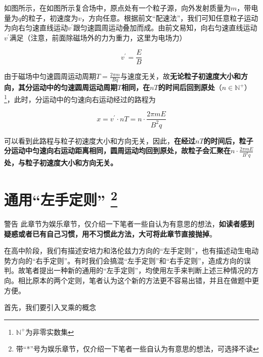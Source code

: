 

如图所示，在如图所示复合场中，原点处有一个粒子源，向外发射质量为$m$，带电量为$q$的粒子，初速度为$v$，方向任意。根据前文“配速法”，我们可知任意粒子运动为向右匀速直线运动$v^{\prime}$跟匀速圆周运动叠加而成。由前文易知，向右匀速直线运动$v^{\prime}$满足（注意，前面除磁场外的力为重力，这里为电场力）

$$v^{\prime} = \frac{E}{B}$$

由于磁场中匀速圆周运动周期$T = \frac{2 \pi m}{Bq}$与速度无关，故\textbf{无论粒子初速度大小和方向，其分运动中的匀速圆周运动周期$T$相同，在$n T$的时间后回到原处}（$n \in \mathbb{N^{+}}$）\footnote{$\mathbb{N^{+}}$为非零实数集}，此时，分运动中的匀速向右运动经过的路程为

$$x = v^{\prime} \cdot n T = n \cdot \frac{2 \pi m E}{B^2 q}$$

可以看到此路程与粒子初速度大小和方向无关，因此，\textbf{在经过$nT$的时间后，粒子分运动中匀速向右运动距离相同，圆周运动均回到原处，故粒子会汇聚在$n \cdot \frac{2 \pi m E}{B^2 q}$处，与粒子初速度大小和方向无关。}

\section{通用“左手定则” \quad * \protect \footnote{带“*”号为娱乐章节，仅介绍一下笔者一些自认为有意思的想法，可选择不读}}

\label{s_tyzsdz}

\begin{mk}{警告}{}
此章节为娱乐章节，仅介绍一下笔者一些自认为有意思的想法，\textbf{如读者感到疑惑或者已有自己习惯，用不习惯此方法，大可将此章节直接抛掉}。
\end{mk}

在高中阶段，我们有描述安培力和洛伦兹力方向的“左手定则”，也有描述动生电动势方向的“右手定则”。有时我们会搞混“左手定则”和“右手定则”，造成方向的误判。故笔者提出一种新的通用的“左手定则”，均使用左手来判断上述三种情况的方向。相比原本的两个定则，笔者认为这个新的方法更不容易出错，并且在做题中更方便。

首先，我们要引入叉乘的概念


